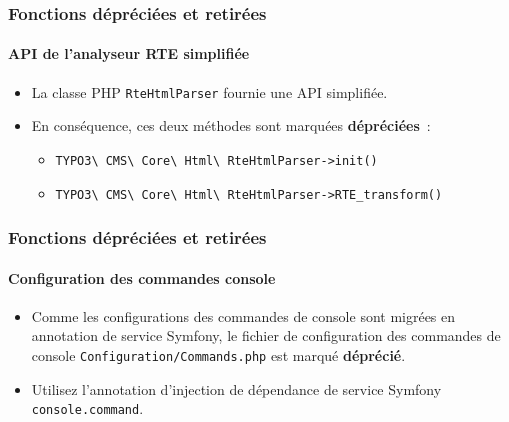 
\begin{frame}[fragile]
	\frametitle{Fonctions dépréciées et retirées}
	\framesubtitle{API de l'analyseur RTE simplifiée}

	\begin{itemize}
		\item La classe PHP \texttt{RteHtmlParser} fournie une API simplifiée.
		\item En conséquence, ces deux méthodes sont marquées \textbf{dépréciées}~:

			\begin{itemize}
				\item \texttt{TYPO3\textbackslash
					CMS\textbackslash
					Core\textbackslash
					Html\textbackslash
					RteHtmlParser->init()}
				\item \texttt{TYPO3\textbackslash
					CMS\textbackslash
					Core\textbackslash
					Html\textbackslash
					RteHtmlParser->RTE\_transform()}
			\end{itemize}

	\end{itemize}

\end{frame}


\begin{frame}[fragile]
	\frametitle{Fonctions dépréciées et retirées}
	\framesubtitle{Configuration des commandes console}

	\begin{itemize}
		\item Comme les configurations des commandes de console sont migrées en annotation de service Symfony,
			le fichier de configuration des commandes de console \texttt{Configuration/Commands.php}
			est marqué \textbf{déprécié}.
		\item Utilisez l'annotation d'injection de dépendance de service Symfony \texttt{console.command}.

	\end{itemize}

\end{frame}


